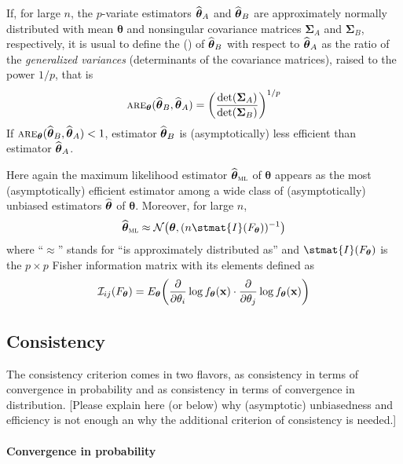 If, for large $n$, the $p$-variate estimators $\widehat{\boldsymbol\theta}_A$ and
$\widehat{\boldsymbol\theta}_B$ are approximately normally distributed with mean
$\boldsymbol\theta$ and nonsingular covariance matrices $\boldsymbol\Sigma_A$ and
$\boldsymbol\Sigma_B$, respectively, it is usual to define the 
\emph{} () of
$\widehat{\boldsymbol\theta}_B$ with respect to $\widehat{\boldsymbol\theta}_A$ as
the ratio of the \emph{generalized variances} (determinants of the covariance
matrices), raised to the power $1/p$, that is
\[
    \stsc{ARE}_{\boldsymbol\theta}(\sthat{\boldsymbol\theta}_B, \sthat{\boldsymbol\theta}_A)
    = \left(\frac{ \det(\boldsymbol\Sigma_A)}{\det(\boldsymbol\Sigma_B)}\right)^{1/p}
\]
If $\stsc{ARE}_{\boldsymbol\theta}(\sthat{\boldsymbol\theta}_B,
\sthat{\boldsymbol\theta}_A)<1$, estimator $\widehat{\boldsymbol\theta}_B$ is
(asymptotically) less efficient than estimator $\widehat{\boldsymbol\theta}_A$.

Here again the maximum likelihood estimator $\sthat{\boldsymbol\theta}_\stsc{ML}$ of
$\boldsymbol\theta$ appears as the most (asymptotically) efficient estimator among a
wide class of (asymptotically) unbiased estimators $\widehat{\boldsymbol\theta}$ of
$\boldsymbol\theta$. Moreover, for large $n$,
\[
    \sthat{\boldsymbol\theta}_\stsc{ML} \approx 
    \mathcal{N}\left(\boldsymbol\theta, (n \stmat{I}(F_{\boldsymbol\theta}))^{-1}\right)
\]
where “$\approx$” stands for “is approximately distributed as” and
$\stmat{I}(F_{\boldsymbol\theta})$ is the $p\times p$ Fisher information matrix
with its elements defined as
\[
    \mathcal{I}_{ij}\left(F_{\boldsymbol\theta}\right) =
    E_{\boldsymbol\theta}\left(
    \frac{\partial}{\partial\theta_i}\log f_{\boldsymbol\theta}(\stvec{x}) \cdot 
    \frac{\partial}{\partial \theta_j}\log f_{\boldsymbol\theta}(\stvec{x})
    \right)
\] 


\subsection{Consistency}
\Index[consistency]{}

The consistency criterion comes in two flavors, as consistency in terms of
convergence in probability and as consistency in terms of convergence in
distribution. \alert{[Please explain here (or below) why (asymptotic)
unbiasedness and efficiency is not enough an why the additional criterion of
consistency is needed.]}

\paragraph{Convergence in probability}

